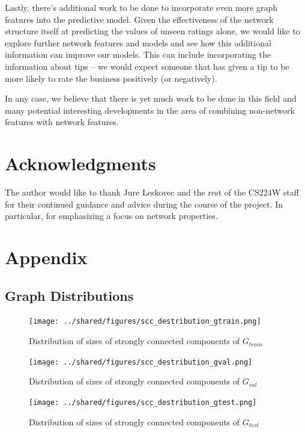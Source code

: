\documentclass[letterpaper, 10 pt, conference]{ieeeconf}  %
\begin{document}
Lastly, there's additional work to be done to incorporate even more graph features into the predictive model. Given the effectiveness of the network structure itself at predicting the values of unseen ratings alone, we would like to explore further network features and models and see how this additional information can improve our models. This can include incorporating the information about tips -- we would expect someone that has given a tip to be more likely to rate the business positively (or negatively).

In any case, we believe that there is yet much work to be done in this field and many potential interesting developments in the area of combining non-network features with network features.


\section{Acknowledgments}
The author would like to thank Jure Leskovec and the rest of the CS224W staff for their continued guidance and advice during the course of the project. In particular, for emphasizing a focus on network properties.

{}


\section{Appendix}

\subsection{Graph Distributions}
\label{sec:graph_distributions}
\begin{figure}[h!]
\centering
\texttt{[image: ../shared/figures/scc\_destribution\_gtrain.png]}
\caption{Distribution of sizes of strongly connected components of $G_{train}$}
\label{fig:distribution_scc_g_train}
\end{figure}
\begin{figure}[h!]
\centering
\texttt{[image: ../shared/figures/scc\_destribution\_gval.png]}
\caption{Distribution of sizes of strongly connected components of $G_{val}$}
\label{fig:distribution_scc_g_val}
\end{figure}
\begin{figure}[h!]
\centering
\texttt{[image: ../shared/figures/scc\_destribution\_gtest.png]}
\caption{Distribution of sizes of strongly connected components of $G_{test}$}
\label{fig:distribution_scc_g_test}
\end{figure}
\end{document}
